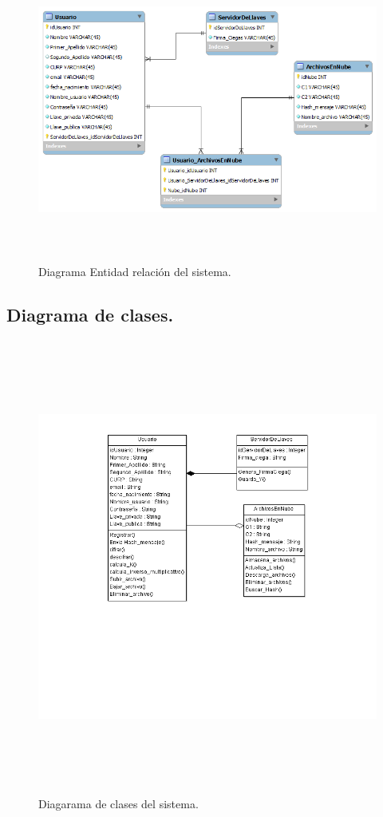 \begin{figure}[H]
\centering
	\includegraphics[width=16cm, height=10cm]{./images/BDTT2.png}
	\caption{Diagrama Entidad relación del sistema.}

\end{figure} 

\newpage

\subsection{Diagrama de clases. }

\begin{figure}[H]
\centering
	\includegraphics[width=18cm, height=15cm]{./images/DiagramaClasesTT.png}
	\caption{Diagarama de clases del sistema.}

\end{figure} 
\newpage

